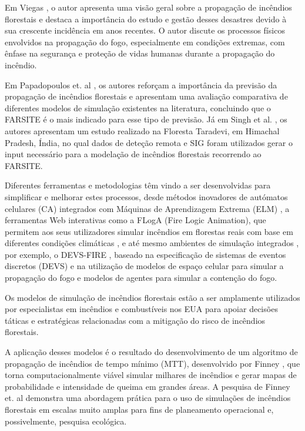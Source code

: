 Em Viegas \cite{Viegas2011}, o autor apresenta uma visão geral sobre a propagação de incêndios florestais e destaca a importância do estudo e gestão desses desastres devido à sua crescente incidência em anos recentes. O autor discute os processos físicos envolvidos na propagação do fogo, especialmente em condições extremas, com ênfase na segurança e proteção de vidas humanas durante a propagação do incêndio.

Em Papadopoulos et. al \cite{Papadopoulos2011}, os autores reforçam a importância da previsão da propagação de incêndios florestais e apresentam uma avaliação comparativa de diferentes modelos de simulação existentes na literatura, concluindo que o FARSITE é o mais indicado para esse tipo de previsão. Já em Singh et al. \cite{Singh2017}, os autores apresentam um estudo realizado na Floresta Taradevi, em Himachal Pradesh, Índia, no qual dados de deteção remota e SIG foram utilizados gerar o input necessário para a modelação de incêndios florestais recorrendo ao FARSITE.

Diferentes ferramentas e metodologias têm vindo a ser desenvolvidas para simplificar e melhorar estes processos, desde métodos inovadores de autómatos celulares (CA) integrados com Máquinas de Aprendizagem Extrema (ELM) \cite{Zheng2017}, a ferramentas Web interativas como a FLogA (Fire Logic Animation), que permitem aos seus utilizadores simular incêndios em florestas reais com base em diferentes condições climáticas \cite{Bogdos2013}, e até mesmo ambientes de simulação integrados \cite{Finney2011}, por exemplo, o DEVS-FIRE \cite{Ntaimo2008}, baseado na especificação de sistemas de eventos discretos (DEVS) e na utilização de modelos de espaço celular para simular a propagação do fogo e modelos de agentes para simular a contenção do fogo.

Os modelos de simulação de incêndios florestais estão a ser amplamente utilizados por especialistas em incêndios e combustíveis nos EUA para apoiar decisões táticas e estratégicas relacionadas com a mitigação do risco de incêndios florestais. \cite{Ager2009}

A aplicação desses modelos é o resultado do desenvolvimento de um algoritmo de propagação de incêndios de tempo mínimo (MTT), desenvolvido por Finney \cite{Ager2009}, que torna computacionalmente viável simular milhares de incêndios e gerar mapas de probabilidade e intensidade de queima em grandes áreas. A pesquisa de Finney et. al \cite{Ager2009, FinneyUS2011} demonstra uma abordagem prática para o uso de simulações de incêndios florestais em escalas muito amplas para fins de planeamento operacional e, possivelmente, pesquisa ecológica.